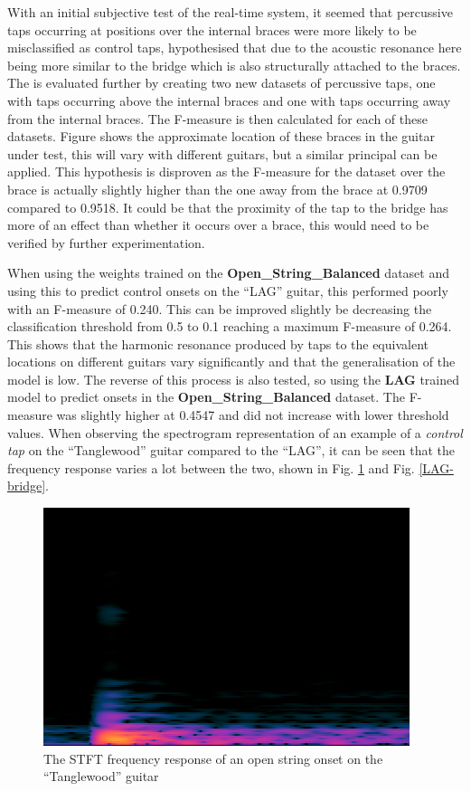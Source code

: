 \documentclass[conference]{IEEEtran}
\begin{document}
With an initial subjective test of the real-time system, it seemed that percussive taps occurring at positions over the internal braces were more likely to be misclassified as control taps, hypothesised that due to the acoustic resonance here being more similar to the bridge which is also structurally attached to
the braces. The is evaluated further by creating two new datasets of percussive taps, one with taps occurring above the internal braces and one with taps occurring away from the internal braces. The F-measure is then calculated for each of these datasets.
Figure shows the approximate location of these braces in the guitar under test, this will vary with different guitars, but a similar principal can be applied. This hypothesis is disproven as the F-measure for the dataset over the brace is actually slightly higher than the 
one away from the brace at 0.9709 compared to 0.9518. It could be that the proximity of the tap to the bridge has more of an effect than whether it occurs over a brace, this would need to be verified by further experimentation. 

When using the weights trained on the \textbf{Open\_String\_Balanced} dataset and using this to predict control onsets on the ``LAG'' guitar, this performed poorly with an F-measure of 0.240. This can be improved slightly be decreasing the classification threshold from 0.5 to 0.1 reaching
a maximum F-measure of 0.264. This shows that the harmonic resonance produced by taps to the equivalent locations on different guitars vary significantly and that the generalisation of the model is low. The reverse of this process is also tested, so using the \textbf{LAG} trained model to predict
onsets in the \textbf{Open\_String\_Balanced} dataset. The F-measure was slightly higher at 0.4547 and did not increase with lower threshold values. When observing the spectrogram representation of an example of a \emph{control tap} on the ``Tanglewood'' guitar compared to the ``LAG'',
it can be seen that the frequency response varies a lot between the two, shown in Fig. \ref{acoustic-bridge} and Fig. \ref{LAG-bridge}.

\begin{figure}[htbp]
    \centerline{\includegraphics[scale=0.4]{acoustic-bridge.png}}
    \caption{The STFT frequency response of an open string onset on the ``Tanglewood'' guitar}
    \label{acoustic-bridge}
    \end{figure}
\end{document}
